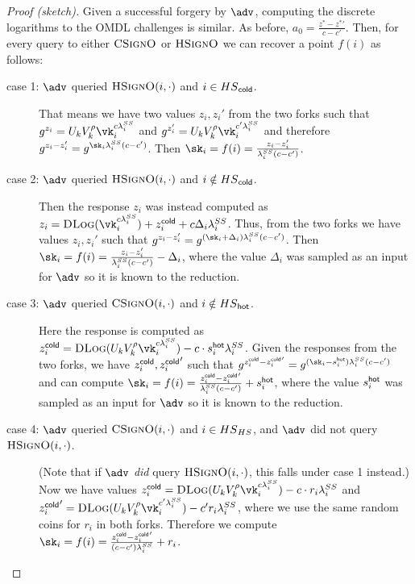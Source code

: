 \begin{proof}[Proof (sketch)]
Given a successful forgery by $\adv$, computing the discrete logarithms to the OMDL challenges is similar. As before, $a_0 = \frac{z^* - {z^*}'}{c-c'}$. Then, for every query to either ${\textsc{CSignO}}$ or ${\textsc{HSignO}}$ we can recover a point $f(i)$ as follows:
\begin{description}
    \item[case 1: $\adv$ queried ${\textsc{HSignO}}(i, \cdot)$ and $i \in {\ensuremath{HS}}_{\mathsf{cold}}$.] That means we have two values $z_i, z_i'$ from the two forks such that $g^{z_i} = U_k V_k^\rho \vk_i^{c \lambda_i^\signset}$ and $g^{z_i'} = U_k V_k^\rho \vk_i^{c' \lambda_i^\signset}$ and therefore $g^{z_i - z_i'} = g^{\sk_i \lambda_i^\signset (c-c')}$. Then $\sk_i = f(i) = \frac{z_i - z_i'}{\lambda_i^\signset(c-c')}$.
    \item[case 2: $\adv$ queried ${\textsc{HSignO}}(i, \cdot)$ and $i \notin {\ensuremath{HS}}_{\mathsf{cold}}$.] Then the response $z_i$ was instead computed as $z_i = \DLogO(\vk_i^{c \lambda_i^\signset}) + z_i^\cold + c \Delta_i \lambda_i^\signset$. Thus,  from the two forks we have values $z_i, z_i'$ such that $g^{z_i-z_i'} = g^{(\sk_i + \Delta_i) \lambda_i^\signset (c-c')}$. Then $\sk_i = f(i) = \frac{z_i - z_i'}{\lambda_i^\signset(c-c')} - \Delta_i$, where the value $\Delta_i$ was sampled as an input for $\adv$ so it is known to the reduction.
    \item[case 3: $\adv$ queried ${\textsc{CSignO}}(i, \cdot)$ and $i \notin {\ensuremath{HS}}_{\mathsf{hot}}$.] Here the response is computed as $z_i^\cold = \DLogO(U_k V_k^\rho \vk_i^{c \lambda_i^\signset}) - c \cdot \hsecret \lambda_i^\signset$. Given the responses from the two forks, we have $z_i^{\mathsf{cold}}, {z_i^{\mathsf{cold}}}'$ such that $g^{z_i^\cold - {z_i^\cold}'} = g^{(\sk_i - \hsecret) \lambda_i^\signset (c-c')}$ and can compute $\sk_i = f(i) = \frac{z_i^\cold - {z_i^\cold}'}{\lambda_i^\signset (c-c')} + \hsecret$, where the value $s_i^{\mathsf{hot}}$ was sampled as an input for $\adv$ so it is known to the reduction.
    \item[case 4: $\adv$ queried ${\textsc{CSignO}}(i, \cdot)$ and $i \in {\ensuremath{HS}}_{HS}$, and $\adv$ did not query ${\textsc{HSignO}}(i, \cdot)$.] (Note that if $\adv$ \emph{did} query ${\textsc{HSignO}}(i, \cdot)$, this falls under case 1 instead.) Now we have values $z_i^\cold = \DLogO(U_k V_k^\rho \vk_i^{c \lambda_i^\signset}) - c \cdot r_i \lambda_i^\signset$ and ${z_i^\cold}' = \DLogO(U_k V_k^\rho \vk_i^{c' \lambda_i^\signset}) - c' r_i \lambda_i^\signset$, where we use the same random coins for $r_i$ in both forks. Therefore we compute $\sk_i = f(i) = \frac{z_i^\cold - {z_i^\cold}'}{(c-c')\lambda_i^\signset} + r_i$.
\end{description}


\end{proof}
